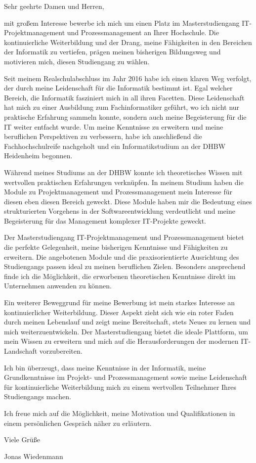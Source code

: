 
\begingroup
\renewcommand{\paragraphstyle}{\fontsize{11pt}{15pt}\bodyfontlight\upshape\color{text}}
\begin{cvparagraph}
    Sehr geehrte Damen und Herren,

    mit großem Interesse bewerbe ich mich um einen Platz im Masterstudiengang IT-Projektmanagement und Prozessmanagement an Ihrer Hochschule. Die kontinuierliche Weiterbildung und der Drang, meine Fähigkeiten in den Bereichen der Informatik zu vertiefen, prägen meinen bisherigen Bildungsweg und motivieren mich, diesen Studiengang zu wählen.

    Seit meinem Realschulabschluss im Jahr 2016 habe ich einen klaren Weg verfolgt, der durch meine Leidenschaft für die Informatik bestimmt ist. Egal welcher Bereich, die Informatik fasziniert mich in all ihren Facetten. Diese Leidenschaft hat mich zu einer Ausbildung zum Fachinformatiker geführt, wo ich nicht nur praktische Erfahrung sammeln konnte, sondern auch meine Begeisterung für die IT weiter entfacht wurde. Um meine Kenntnisse zu erweitern und meine beruflichen Perspektiven zu verbessern, habe ich anschließend die Fachhochschulreife nachgeholt und ein Informatikstudium an der DHBW Heidenheim begonnen.

    Während meines Studiums an der DHBW konnte ich theoretisches Wissen mit wertvollen praktischen Erfahrungen verknüpfen. In meinem Studium haben die Module zu Projektmanagement und Prozessmanagement mein Interesse für diesen eben diesen Bereich geweckt. Diese Module haben mir die Bedeutung eines strukturierten Vorgehens in der Softwareentwicklung verdeutlicht und meine Begeisterung für das Management komplexer IT-Projekte geweckt.

    Der Masterstudiengang IT-Projektmanagement und Prozessmanagement bietet die perfekte Gelegenheit, meine bisherigen Kenntnisse und Fähigkeiten zu erweitern. Die angebotenen Module und die praxisorientierte Ausrichtung des Studiengangs passen ideal zu meinen beruflichen Zielen. Besonders ansprechend finde ich die Möglichkeit, die erworbenen theoretischen Kenntnisse direkt im Unternehmen anwenden zu können.

    Ein weiterer Beweggrund für meine Bewerbung ist mein starkes Interesse an kontinuierlicher Weiterbildung. Dieser Aspekt zieht sich wie ein roter Faden durch meinen Lebenslauf und zeigt meine Bereitschaft, stets Neues zu lernen und mich weiterzuentwickeln. Der Masterstudiengang bietet die ideale Plattform, um mein Wissen zu erweitern und mich auf die Herausforderungen der modernen IT-Landschaft vorzubereiten.

    Ich bin überzeugt, dass meine Kenntnisse in der Informatik, meine Grundkenntnisse im Projekt- und Prozessmanagement sowie meine Leidenschaft für kontinuierliche Weiterbildung mich zu einem wertvollen Teilnehmer Ihres Studiengangs machen. 

    Ich freue mich auf die Möglichkeit, meine Motivation und Qualifikationen in einem persönlichen Gespräch näher zu erläutern.

    Viele Grüße

    Jonas Wiedenmann
\end{cvparagraph}
\endgroup